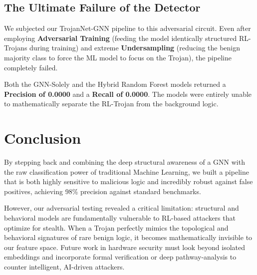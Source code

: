 \documentclass[12pt]{article}
\begin{document}
\subsection{The Ultimate Failure of the Detector}
We subjected our TrojanNet-GNN pipeline to this adversarial circuit. Even after employing \textbf{Adversarial Training} (feeding the model identically structured RL-Trojans during training) and extreme \textbf{Undersampling} (reducing the benign majority class to force the ML model to focus on the Trojan), the pipeline completely failed. 

Both the GNN-Solely and the Hybrid Random Forest models returned a \textbf{Precision of 0.0000} and a \textbf{Recall of 0.0000}. The models were entirely unable to mathematically separate the RL-Trojan from the background logic. 

\section{Conclusion}
By stepping back and combining the deep structural awareness of a GNN with the raw classification power of traditional Machine Learning, we built a pipeline that is both highly sensitive to malicious logic and incredibly robust against false positives, achieving 98\% precision against standard benchmarks.

However, our adversarial testing revealed a critical limitation: structural and behavioral models are fundamentally vulnerable to RL-based attackers that optimize for stealth. When a Trojan perfectly mimics the topological and behavioral signatures of rare benign logic, it becomes mathematically invisible to our feature space. Future work in hardware security must look beyond isolated embeddings and incorporate formal verification or deep pathway-analysis to counter intelligent, AI-driven attackers.
\end{document}
